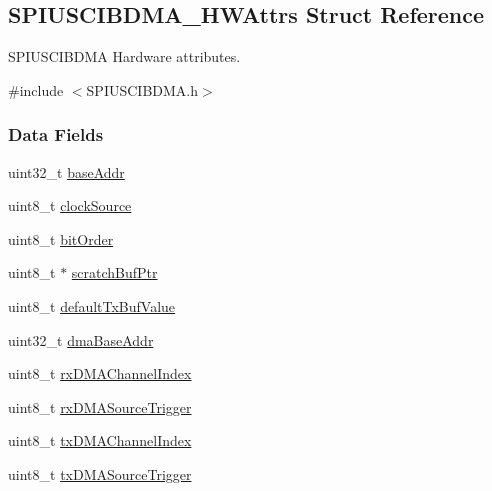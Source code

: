 \subsection{S\+P\+I\+U\+S\+C\+I\+B\+D\+M\+A\+\_\+\+H\+W\+Attrs Struct Reference}
\label{struct_s_p_i_u_s_c_i_b_d_m_a___h_w_attrs}


S\+P\+I\+U\+S\+C\+I\+B\+D\+M\+A Hardware attributes.  




{\ttfamily \#include $<$S\+P\+I\+U\+S\+C\+I\+B\+D\+M\+A.\+h$>$}

\subsubsection*{Data Fields}
\begin{DoxyCompactItemize}
\item 
uint32\+\_\+t \hyperlink{struct_s_p_i_u_s_c_i_b_d_m_a___h_w_attrs_aaae9facc7079e3bfd9b7a3b74d6f8652}{base\+Addr}
\item 
uint8\+\_\+t \hyperlink{struct_s_p_i_u_s_c_i_b_d_m_a___h_w_attrs_acb2a1355cc9a9d58aa4a5d8ce7dd3bdb}{clock\+Source}
\item 
uint8\+\_\+t \hyperlink{struct_s_p_i_u_s_c_i_b_d_m_a___h_w_attrs_a1f98aef8f8eb4880a35e395528a53f90}{bit\+Order}
\item 
uint8\+\_\+t $\ast$ \hyperlink{struct_s_p_i_u_s_c_i_b_d_m_a___h_w_attrs_a6d1e9c7223a23ecc26c3f4241c452be9}{scratch\+Buf\+Ptr}
\item 
uint8\+\_\+t \hyperlink{struct_s_p_i_u_s_c_i_b_d_m_a___h_w_attrs_a10bc4b0c5477703450364f93ddff1a94}{default\+Tx\+Buf\+Value}
\item 
uint32\+\_\+t \hyperlink{struct_s_p_i_u_s_c_i_b_d_m_a___h_w_attrs_ad75b8f15d31d6f08da669d43787c9844}{dma\+Base\+Addr}
\item 
uint8\+\_\+t \hyperlink{struct_s_p_i_u_s_c_i_b_d_m_a___h_w_attrs_ab92767e7ddea74ed100a42ebd5cdf9e7}{rx\+D\+M\+A\+Channel\+Index}
\item 
uint8\+\_\+t \hyperlink{struct_s_p_i_u_s_c_i_b_d_m_a___h_w_attrs_ae5dce176df8472f28ff3d2767646e550}{rx\+D\+M\+A\+Source\+Trigger}
\item 
uint8\+\_\+t \hyperlink{struct_s_p_i_u_s_c_i_b_d_m_a___h_w_attrs_a0825b66712b946981925d1032926dce5}{tx\+D\+M\+A\+Channel\+Index}
\item 
uint8\+\_\+t \hyperlink{struct_s_p_i_u_s_c_i_b_d_m_a___h_w_attrs_a8cf8e43314d66883d1d680bd2b1d2499}{tx\+D\+M\+A\+Source\+Trigger}
\end{DoxyCompactItemize}


